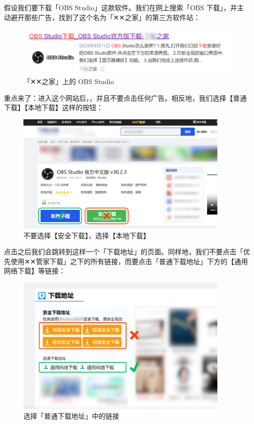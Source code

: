 假设我们要下载「OBS Studio」这款软件。我们在网上搜索「OBS 下载」，并主动避开那些广告，找到了这个名为「✕✕之家」的第三方软件站：

\begin{figure}[htb!]
  \centering
  \includegraphics[width=.7\textwidth]{assets/basic/OBS_third_party.png}
  \caption{「✕✕之家」上的 OBS Studio}
  \label{fig:OBS_third_party}
\end{figure}

重点来了：进入这个网站后，，并且不要点击任何广告。相反地，我们选择【普通下载】【本地下载】这样的按钮：

\begin{figure}[htb!]
  \centering
  \includegraphics[width=10.5cm]{assets/basic/Download_page_1.png}
  \caption{不要选择【安全下载】，选择【本地下载】}
  \label{fig:Download_page_1}
\end{figure}

点击之后我们会跳转到这样一个「下载地址」的页面。同样地，我们不要点击「优先使用✕✕管家下载」之下的所有链接，而要点击「普通下载地址」下方的【通用网络下载】等链接：

\begin{figure}[htb!]
  \centering
  \includegraphics[width=10.5cm]{assets/basic/Download_page_2.png}
  \caption{选择「普通下载地址」中的链接}
  \label{fig:Download_page_2}
\end{figure}

